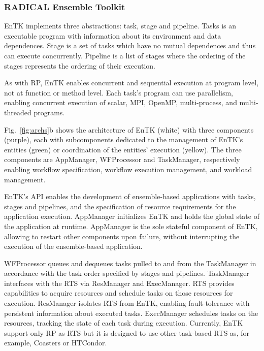 \documentclass[preprint,12pt, a4paper]{elsarticle}
\begin{document}
\subsubsection{RADICAL Ensemble Toolkit}\label{sssec:arch_entk}

EnTK implements three abstractions: task, stage and pipeline. Tasks is an
executable program with information about its environment and data
dependences. Stage is a set of tasks which have no mutual dependences and
thus can execute concurrently. Pipeline is a list of stages where the
ordering of the stages represents the ordering of their execution.

As with RP, EnTK enables concurrent and sequential execution at program
level, not at function or method level. Each task's program can use
parallelism, enabling concurrent execution of scalar, MPI, OpenMP,
multi-process, and multi-threaded programs.


Fig.~\ref{fig:archs}b shows the architecture of EnTK (white) with three
components (purple), each with subcomponents dedicated to the management of
EnTK's entities (green) or coordination of the entities' execution (yellow).
The three components are AppManager, WFProcessor and TaskManager,
respectively enabling workflow specification, workflow execution management,
and workload management.

EnTK's API enables the development of ensemble-based applications with tasks,
stages and pipelines, and the specification of resource requirements for the
application execution. AppManager initializes EnTK and holds the global state
of the application at runtime. AppManager is the sole stateful component of
EnTK, allowing to restart other components upon failure, without interrupting
the execution of the ensemble-based application.

WFProcessor queues and dequeues tasks pulled to and from the TaskManager in
accordance with the task order specified by stages and pipelines. TaskManager
interfaces with the RTS via ResManager and ExecManager. RTS provides
capabilities to acquire resources and schedule tasks on those resources for
execution. ResManager isolates RTS from EnTK, enabling fault-tolerance with
persistent information about executed tasks. ExecManager schedules tasks on
the resources, tracking the state of each task during execution. Currently,
EnTK support only RP as RTS but it is designed to use other task-based RTS
as, for example, Coasters or HTCondor.
\end{document}
